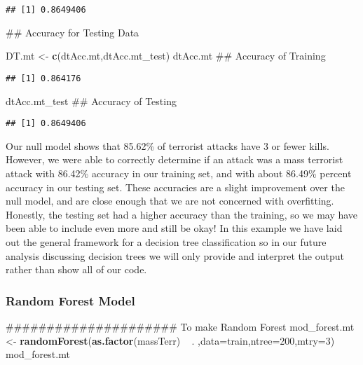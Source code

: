 \documentclass[11pt,letterpaper,]{article}
\newenvironment{Shaded}{\begin{snugshade}}{\end{snugshade}}
\newcommand{\KeywordTok}[1]{\textcolor[rgb]{0.13,0.29,0.53}{\textbf{{#1}}}}
\newcommand{\DataTypeTok}[1]{\textcolor[rgb]{0.13,0.29,0.53}{{#1}}}
\newcommand{\DecValTok}[1]{\textcolor[rgb]{0.00,0.00,0.81}{{#1}}}
\newcommand{\StringTok}[1]{\textcolor[rgb]{0.31,0.60,0.02}{{#1}}}
\newcommand{\NormalTok}[1]{{#1}}
\theoremstyle{definition}
\theoremstyle{definition}
\theoremstyle{definition}
\theoremstyle{remark}
\begin{document}
\begin{verbatim}
## [1] 0.8649406
\end{verbatim}

\begin{Shaded}
\begin{Highlighting}[]
\NormalTok{## Accuracy for Testing Data}


\NormalTok{DT.mt <-}\StringTok{ }\KeywordTok{c}\NormalTok{(dtAcc.mt,dtAcc.mt_test)}
\NormalTok{dtAcc.mt ## Accuracy of Training}
\end{Highlighting}
\end{Shaded}

\begin{verbatim}
## [1] 0.864176
\end{verbatim}

\begin{Shaded}
\begin{Highlighting}[]
\NormalTok{dtAcc.mt_test ## Accuracy of Testing}
\end{Highlighting}
\end{Shaded}

\begin{verbatim}
## [1] 0.8649406
\end{verbatim}

Our null model shows that 85.62\% of terrorist attacks have 3 or fewer
kills. However, we were able to correctly determine if an attack was a
mass terrorist attack with 86.42\% accuracy in our training set, and
with about 86.49\% percent accuracy in our testing set. These accuracies
are a slight improvement over the null model, and are close enough that
we are not concerned with overfitting. Honestly, the testing set had a
higher accuracy than the training, so we may have been able to include
even more and still be okay! In this example we have laid out the
general framework for a decision tree classification so in our future
analysis discussing decision trees we will only provide and interpret
the output rather than show all of our code.

\subsubsection{Random Forest Model}\label{random-forest-model}

\begin{Shaded}
\begin{Highlighting}[]
\NormalTok{##################### To make Random Forest}
\NormalTok{mod_forest.mt <-}\StringTok{ }\KeywordTok{randomForest}\NormalTok{(}\KeywordTok{as.factor}\NormalTok{(massTerr) ~}\StringTok{ }\NormalTok{. ,}\DataTypeTok{data=}\NormalTok{train,}\DataTypeTok{ntree=}\DecValTok{200}\NormalTok{,}\DataTypeTok{mtry=}\DecValTok{3}\NormalTok{)}
\NormalTok{mod_forest.mt}
\end{Highlighting}
\end{Shaded}
\end{document}
